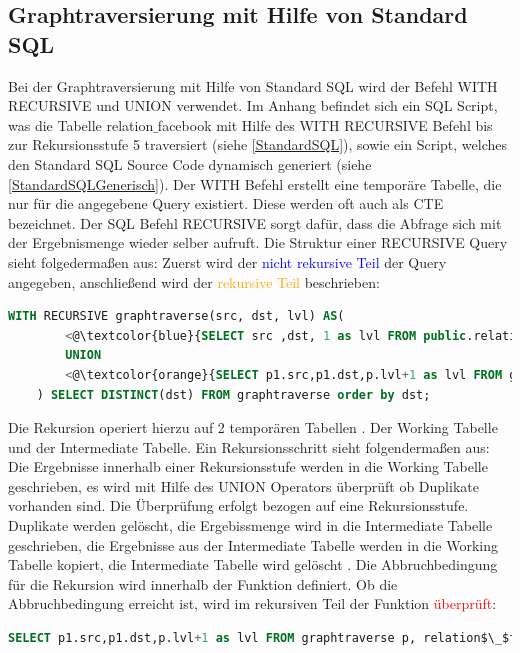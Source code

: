 \subsection{Graphtraversierung mit Hilfe von Standard \ac{SQL}}
\label{postgresStandardSQL}
Bei der Graphtraversierung mit Hilfe von Standard \ac{SQL} wird der Befehl WITH RECURSIVE und UNION verwendet. Im Anhang befindet sich ein SQL
Script, was die Tabelle relation$\_$facebook mit Hilfe des WITH RECURSIVE Befehl bis zur Rekursionsstufe 5 traversiert (siehe \ref{StandardSQL}),
sowie ein Script, welches den Standard SQL Source Code dynamisch generiert (siehe \ref{StandardSQLGenerisch}).
Der WITH Befehl erstellt eine temporäre Tabelle, die nur für die angegebene Query existiert. Diese werden oft auch als \ac{CTE} bezeichnet.
Der SQL Befehl RECURSIVE sorgt dafür, dass die Abfrage sich mit der Ergebnismenge wieder selber aufruft. Die Struktur einer RECURSIVE Query sieht folgedermaßen aus:
Zuerst wird der \textcolor{blue}{nicht rekursive Teil} der Query angegeben, anschließend wird der \textcolor{orange}{rekursive Teil} beschrieben:
\begin{lstlisting}[language=SQL,caption = Rekursiver und nicht rekursiver Teil,frame=single, label={StrukturderQuery} ]
    WITH RECURSIVE graphtraverse(src, dst, lvl) AS(
        <@\textcolor{blue}{SELECT src ,dst, 1 as lvl FROM public.relation$\_$facebook WHERE src =765} @>
        UNION
        <@\textcolor{orange}{SELECT p1.src,p1.dst,p.lvl+1 as lvl FROM graphtraverse p, relation$\_$facebook p1 WHERE p1.src IN ( p.dst ) and lvl<5} @>
    ) SELECT DISTINCT(dst) FROM graphtraverse order by dst;
\end{lstlisting}
Die Rekursion operiert hierzu auf 2 temporären Tabellen
. Der Working Tabelle und der Intermediate Tabelle. Ein Rekursionsschritt sieht folgendermaßen aus: Die Ergebnisse innerhalb einer Rekursionsstufe werden in die
Working Tabelle geschrieben, es wird mit Hilfe des UNION Operators überprüft ob Duplikate vorhanden sind. Die Überprüfung erfolgt bezogen auf eine Rekursionsstufe.
Duplikate werden gelöscht, die Ergebissmenge wird in die Intermediate Tabelle geschrieben, die Ergebnisse aus der Intermediate Tabelle werden in die Working Tabelle
kopiert, die Intermediate Tabelle wird gelöscht \cite{postgreswithrecursive}. Die Abbruchbedingung für die Rekursion wird innerhalb der Funktion definiert. Ob die Abbruchbedingung erreicht ist, wird im
rekursiven Teil der Funktion \textcolor{red}{überprüft}:
\begin{lstlisting}[language=SQL,caption = Überprüfen der Abbruchbedingung,frame=single, label={Abbruchbedingung} ]
    SELECT p1.src,p1.dst,p.lvl+1 as lvl FROM graphtraverse p, relation$\_$facebook p1 WHERE p1.src IN ( p.dst ) and <@\textcolor{red}{lvl<5} @>
\end{lstlisting}
